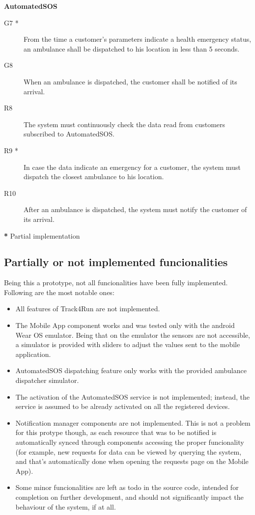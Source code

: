 \documentclass[../main.tex]{subfiles}
\begin{document}
\vspace{8mm}


	{\bf AutomatedSOS}

	\vspace{0.5cm}

	\begin{description}
		\item [G7 *]  From the time a customer's parameters indicate a health emergency status, an ambulance shall be dispatched to his location in less than 5 seconds.
		\item [G8]  When an ambulance is dispatched, the customer shall be notified of its arrival.

		\item [R8] The system must continuously check the data read from customers subscribed to AutomatedSOS.
		\item [R9 *] In case the data indicate an emergency for a customer, the system must dispatch the closest ambulance to his location.
		\item [R10] After an ambulance is dispatched, the system must notify the customer of its arrival.

	\end{description}


\textbf{*} Partial implementation

\subsection{Partially or not implemented funcionalities}

Being this a prototype, not all funcionalities have been fully implemented. Following are the most notable ones:

\begin{itemize}
	\item All features of Track4Run are not implemented.
	\item The Mobile App component works and was tested only with the android Wear OS emulator. Being that on the emulator the sensors are not accessible, a simulator is provided with sliders to adjust the values sent to the mobile application.
	\item AutomatedSOS dispatching feature only works with the provided ambulance dispatcher simulator.
	\item The activation of the AutomatedSOS service is not implemented; instead, the service is assumed to be already activated on all the registered devices.
	\item Notification manager components are not implemented. This is not a problem for this protype though, as each resource that was to be notified is automatically synced through components accessing the proper funcionality (for example, new requests for data can be viewed by querying the system, and that's automatically done when opening the requests page on the Mobile App).
	\item Some minor funcionalities are left as todo in the source code, intended for completion on further development, and should not significantly impact the behaviour of the system, if at all.
\end{itemize}
\end{document}
